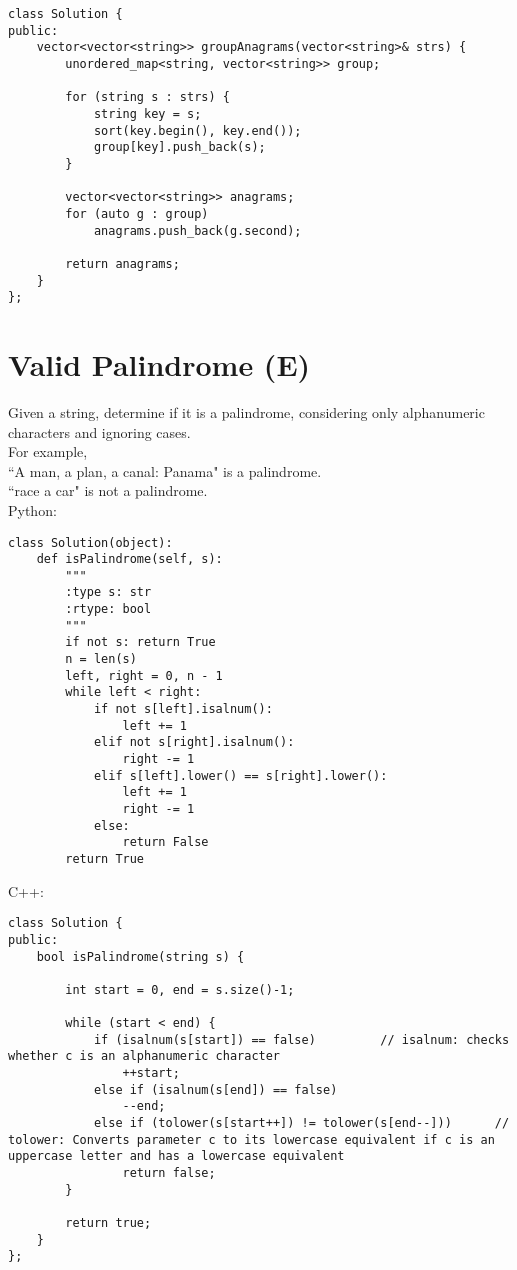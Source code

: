 \begin{lstlisting}
class Solution {
public:
    vector<vector<string>> groupAnagrams(vector<string>& strs) {
        unordered_map<string, vector<string>> group;

        for (string s : strs) {
            string key = s; 
            sort(key.begin(), key.end());
            group[key].push_back(s);
        }
        
        vector<vector<string>> anagrams;
        for (auto g : group)
            anagrams.push_back(g.second);
        
        return anagrams;
    }
};
\end{lstlisting}


\section{Valid Palindrome (E)}
Given a string, determine if it is a palindrome, considering only alphanumeric characters and ignoring cases. \\

For example,\\
``A man, a plan, a canal: Panama" is a palindrome.\\
``race a car" is not a palindrome. \\

Python:
\lstset{language=python}
\begin{lstlisting}
class Solution(object):
    def isPalindrome(self, s):
        """
        :type s: str
        :rtype: bool
        """
        if not s: return True
        n = len(s)
        left, right = 0, n - 1
        while left < right:
            if not s[left].isalnum(): 
                left += 1
            elif not s[right].isalnum():
                right -= 1
            elif s[left].lower() == s[right].lower():
                left += 1
                right -= 1
            else: 
                return False
        return True
\end{lstlisting}

C++:
\lstset{language=C++}
\begin{lstlisting}
class Solution {
public:
    bool isPalindrome(string s) {
        
        int start = 0, end = s.size()-1;
        
        while (start < end) {
            if (isalnum(s[start]) == false)         // isalnum: checks whether c is an alphanumeric character
                ++start;
            else if (isalnum(s[end]) == false)
                --end;        
            else if (tolower(s[start++]) != tolower(s[end--]))      // tolower: Converts parameter c to its lowercase equivalent if c is an uppercase letter and has a lowercase equivalent
                return false;
        }
        
        return true;
    }
};
\end{lstlisting}

